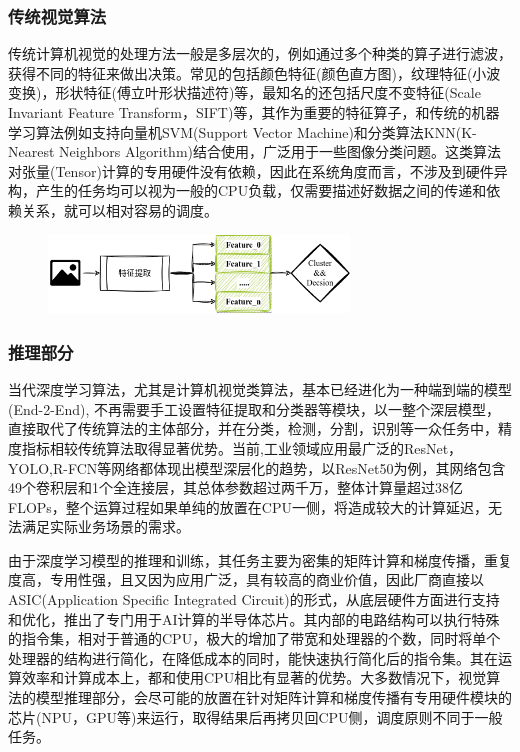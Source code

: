 \documentclass[master]{shtthesis}
\begin{document}
\subsubsection{传统视觉算法}\label{传统视觉算法}
传统计算机视觉的处理方法一般是多层次的，例如通过多个种类的算子进行滤波，获得不同的特征来做出决策。常见的包括颜色特征(颜色直方图)，纹理特征(小波变换)，形状特征(傅立叶形状描述符)等，最知名的还包括尺度不变特征(Scale Invariant Feature Transform，SIFT\cite{ng2003sift})等，其作为重要的特征算子，和传统的机器学习算法例如支持向量机SVM(Support Vector Machine)和分类算法KNN(K-Nearest Neighbors Algorithm)结合使用，广泛用于一些图像分类问题。这类算法对张量(Tensor)计算的专用硬件没有依赖，因此在系统角度而言，不涉及到硬件异构，产生的任务均可以视为一般的CPU负载，仅需要描述好数据之间的传递和依赖关系，就可以相对容易的调度。

\begin{figure}[htbp]
	\centering
	\includegraphics[width=8cm]{img/trad_vis.png}
	\label{基于传统视觉算法的计算流程}
\end{figure}

\subsubsection{推理部分}\label{推理部分}
当代深度学习算法，尤其是计算机视觉类算法，基本已经进化为一种端到端的模型(End-2-End), 不再需要手工设置特征提取和分类器等模块，以一整个深层模型，直接取代了传统算法的主体部分，并在分类，检测，分割，识别等一众任务中，精度指标相较传统算法取得显著优势。当前,工业领域应用最广泛的ResNet，YOLO,R-FCN等网络都体现出模型深层化的趋势，以ResNet50\cite{he2016deep}为例，其网络包含49个卷积层和1个全连接层，其总体参数超过两千万，整体计算量超过38亿FLOPs，整个运算过程如果单纯的放置在CPU一侧，将造成较大的计算延迟，无法满足实际业务场景的需求。

由于深度学习模型的推理和训练，其任务主要为密集的矩阵计算和梯度传播，重复度高，专用性强，且又因为应用广泛，具有较高的商业价值，因此厂商直接以ASIC(Application Specific Integrated Circuit)的形式，从底层硬件方面进行支持和优化，推出了专门用于AI计算的半导体芯片。其内部的电路结构可以执行特殊的指令集，相对于普通的CPU，极大的增加了带宽和处理器的个数，同时将单个处理器的结构进行简化，在降低成本的同时，能快速执行简化后的指令集。其在运算效率和计算成本上，都和使用CPU相比有显著的优势。大多数情况下，视觉算法的模型推理部分，会尽可能的放置在针对矩阵计算和梯度传播有专用硬件模块的芯片(NPU，GPU等)来运行，取得结果后再拷贝回CPU侧，调度原则不同于一般任务。
\end{document}
